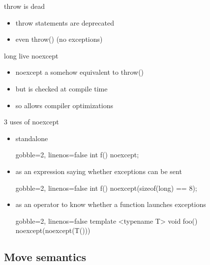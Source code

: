 \begin{frame}[fragile]
  \begin{block}{throw is dead}
    \begin{itemize}
    \item throw statements are deprecated
    \item even throw() (no exceptions)
    \end{itemize}
  \end{block}
  \pause
  \begin{exampleblock}{long live noexcept}
    \begin{itemize}
    \item noexcept a somehow equivalent to throw()
    \item but is checked at compile time
    \item so allows compiler optimizations
    \end{itemize}
  \end{exampleblock}
\end{frame}

\begin{frame}[fragile]
  \begin{block}{3 uses of noexcept}
    \begin{itemize}
    \item standalone
      \begin{cppcode*}{gobble=2, linenos=false}
        int f() noexcept;
      \end{cppcode*}
    \item as an expression saying whether exceptions can be sent
      \begin{cppcode*}{gobble=2, linenos=false}
        int f() noexcept(sizeof(long) == 8);
      \end{cppcode*}
    \item as an operator to know whether a function launches exceptions
      \begin{cppcode*}{gobble=2, linenos=false}
        template <typename T> void foo()
             noexcept(noexcept(T())) {}
      \end{cppcode*}
   \end{itemize}
  \end{block}
\end{frame}

\subsection[mv]{Move semantics}

